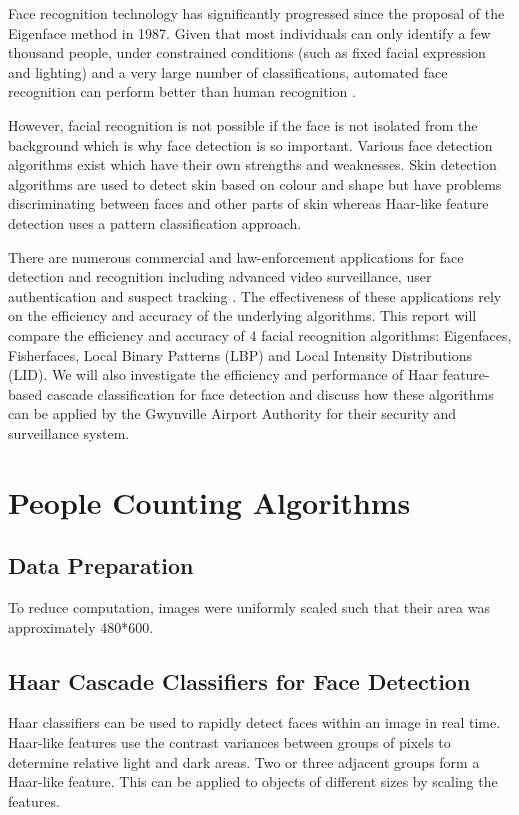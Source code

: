 \documentclass{article}
\begin{document}
Face recognition technology has significantly progressed since the proposal of the Eigenface method in 1987. Given that most individuals can only identify a few thousand people, under constrained conditions (such as fixed facial expression and lighting) and a very large number of classifications, automated face recognition can perform better than human recognition \cite{li2011handbook}.

However, facial recognition is not possible if the face is not isolated from the background \cite{wilson2006facial} which is why face detection is so important. Various face detection algorithms exist which have their own strengths and weaknesses. Skin detection algorithms are used to detect skin based on colour and shape but have problems discriminating between faces and other parts of skin whereas Haar-like feature detection uses a pattern classification approach.

There are numerous commercial and law-enforcement applications for face detection and recognition including advanced video surveillance, user authentication and suspect tracking \cite{zhao2003face}. The effectiveness of these applications rely on the efficiency and accuracy of the underlying algorithms. This report will compare the efficiency and accuracy of 4 facial recognition algorithms: Eigenfaces, Fisherfaces, Local Binary Patterns (LBP) and Local Intensity Distributions (LID). We will also investigate the efficiency and performance of Haar feature-based cascade classification for face detection and discuss how these algorithms can be applied by the Gwynville Airport Authority for their security and surveillance system.



\section{People Counting Algorithms}
\subsection{Data Preparation}
To reduce computation, images were uniformly scaled such that their area was approximately 480*600.

\subsection{Haar Cascade Classifiers for Face Detection}
Haar classifiers can be used to rapidly detect faces within an image in real time. Haar-like features use the contrast variances between groups of pixels to determine relative light and dark areas. Two or three adjacent groups form a Haar-like feature. This can be applied to objects of different sizes by scaling the features.
\end{document}
